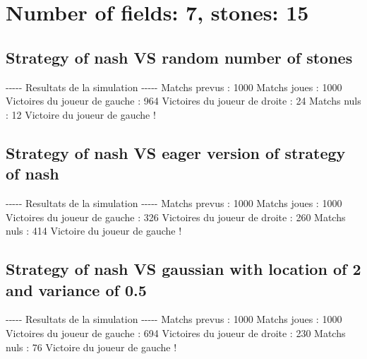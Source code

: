 \documentclass{article}%
\begin{document}
%
\normalsize%
\section{Number of fields: 7, stones: 15}%
\label{sec:Number of fields 7, stones 15}%
\subsection{Strategy of nash VS random number of stones}%
\label{subsec:Strategy of nash VS random number of stones}%
{-}{-}{-}{-}{-} Resultats de la simulation {-}{-}{-}{-}{-}\newline%
		\newline%
Matchs prevus : 1000\newline%
Matchs joues : 1000\newline%
\newline%
Victoires du joueur de gauche : 964\newline%
Victoires du joueur de droite : 24\newline%
Matchs nuls : 12\newline%
\newline%
Victoire du joueur de gauche !

%
\subsection{Strategy of nash VS eager version of strategy of nash}%
\label{subsec:Strategy of nash VS eager version of strategy of nash}%
{-}{-}{-}{-}{-} Resultats de la simulation {-}{-}{-}{-}{-}\newline%
		\newline%
Matchs prevus : 1000\newline%
Matchs joues : 1000\newline%
\newline%
Victoires du joueur de gauche : 326\newline%
Victoires du joueur de droite : 260\newline%
Matchs nuls : 414\newline%
\newline%
Victoire du joueur de gauche !

%
\subsection{Strategy of nash VS gaussian with location of 2 and variance of 0.5}%
\label{subsec:Strategy of nash VS gaussian with location of 2 and variance of 0.5}%
{-}{-}{-}{-}{-} Resultats de la simulation {-}{-}{-}{-}{-}\newline%
		\newline%
Matchs prevus : 1000\newline%
Matchs joues : 1000\newline%
\newline%
Victoires du joueur de gauche : 694\newline%
Victoires du joueur de droite : 230\newline%
Matchs nuls : 76\newline%
\newline%
Victoire du joueur de gauche !
\end{document}
